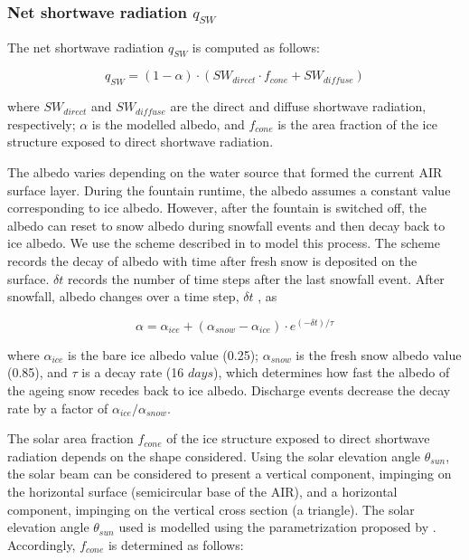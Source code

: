 \subsubsection{Net shortwave radiation \texorpdfstring{$q_{SW}$}{Lg}}

The net shortwave radiation $q_{SW}$ is computed as follows:

\begin{equation} q_{SW} = (1- \alpha)\cdot (SW_{direct} \cdot f_{cone} + SW_{diffuse}) \label{eqn:SW} \end{equation}

where $SW_{direct}$ and $SW_{diffuse}$ are the direct and diffuse shortwave radiation, respectively; $\alpha$ is the
modelled albedo, and $f_{cone}$ is the area fraction of the ice structure exposed to direct shortwave
radiation.

The albedo varies depending on the water source that formed the current AIR surface layer. During the fountain
runtime, the albedo assumes a constant value corresponding to ice albedo. However, after the fountain is
switched off, the albedo can reset to snow albedo during snowfall events and then decay back to ice albedo. We
use the scheme described in \cite{oerlemansYearRecordGlobal1998} to model this process. The scheme records the
decay of albedo with time after fresh snow is deposited on the surface. $\delta t$ records the number of time
steps after the last snowfall event. After snowfall, albedo changes over a time step, $\delta t$ , as

\begin{equation} \alpha=\alpha_{ice}+(\alpha_{snow}-\alpha_{ice}) \cdot e^{(-\delta t)/\tau} \label{eqn:alb}
\end{equation}

where $\alpha_{ice}$ is the bare ice albedo value (0.25); $\alpha_{snow}$ is the fresh snow albedo value (0.85),
and $\tau$ is a decay rate (16 $days$), which determines how fast the albedo of the ageing snow recedes back to
ice albedo. Discharge events decrease the decay rate by a factor of $\alpha_{ice}/\alpha_{snow}$.

The solar area fraction $f_{cone}$ of the ice structure exposed to direct shortwave radiation depends on the shape
considered. Using the solar elevation angle $\theta_{sun}$, the solar beam can be considered to present a vertical
component, impinging on the horizontal surface (semicircular base of the AIR), and a horizontal component,
impinging on the vertical cross section (a triangle). The solar elevation angle $\theta_{sun}$ used is modelled
using the parametrization proposed by \cite{woolfComputationSolarElevation1968}. Accordingly, $f_{cone}$ is determined as follows:

